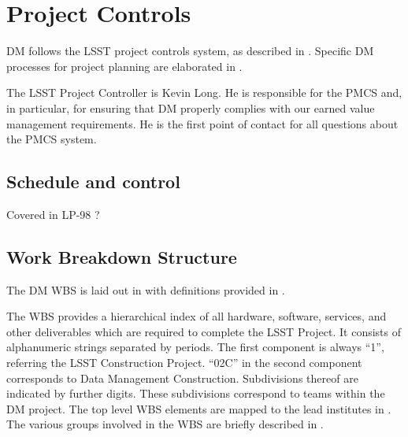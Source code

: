 \section{Project Controls}\label{sect:dmpc}

DM follows the LSST project controls system, as described in .
Specific DM processes for project planning are elaborated in .

The LSST Project Controller is Kevin Long.
He is responsible for the PMCS and, in particular, for ensuring that DM properly complies with our earned value management requirements.
He is the first point of contact for all questions about the PMCS system.

\subsection{Schedule  and control}
Covered in LP-98 ?

\subsection{Work Breakdown Structure} \label{sect:WBS}

The DM WBS is laid out in  with definitions provided in .

The WBS provides a hierarchical index of all hardware, software, services, and other deliverables which are required to complete the LSST Project.
It consists of alphanumeric strings separated by periods.
The first component is always “1”, referring the LSST Construction Project.
``02C'' in the second component corresponds to Data Management Construction.
Subdivisions thereof are indicated by further digits.
These subdivisions correspond to teams within the DM project.
The top level WBS elements are mapped to the lead institutes in .
The various groups involved in the WBS are briefly described in .

